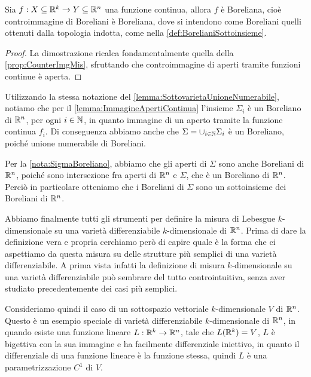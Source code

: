 \begin{lemma}\label{lemma:ContinuaImplicaBoreliana}
	Sia $f:X\subseteq\mathbb R^k\to Y\subseteq\mathbb R^n$ una funzione continua, allora $f$ è Boreliana, cioè controimmagine di Boreliani è Boreliana, dove si intendono come Boreliani quelli ottenuti dalla topologia indotta, come nella \cref{def:BorelianiSottoinsieme}. 
\end{lemma}
\begin{proof}
	La dimostrazione ricalca fondamentalmente quella della \cref{prop:CounterImgMis}, sfruttando che controimmagine di aperti tramite funzioni continue è aperta.
\end{proof}

\begin{remark}\label{nota:SigmaBoreliano}
	Utilizzando la stessa notazione del \cref{lemma:SottovarietaUnioneNumerabile}, notiamo che per il \cref{lemma:ImmagineApertiContinua} l'insieme $\Sigma_i$ è un Boreliano di $\mathbb R^n$, per ogni $i\in\mathbb N$, in quanto immagine di un aperto tramite la funzione continua $f_i$. Di conseguenza abbiamo anche che $\Sigma=\cup_{i\in\mathbb N}\Sigma_i$ è un Boreliano, poiché unione numerabile di Boreliani.  
\end{remark}

\begin{remark}\label{nota:BorelianiSottovarieta}
	Per la \cref{nota:SigmaBoreliano}, abbiamo che gli aperti di $\Sigma$ sono anche Boreliani di $\mathbb R^n$, poiché sono intersezione fra aperti di $\mathbb R^n$ e $\Sigma$, che è un Boreliano di $\mathbb R^n$. Perciò in particolare otteniamo che i Boreliani di $\Sigma$ sono un sottoinsieme dei Boreliani di $\mathbb R^n$.
\end{remark}

Abbiamo finalmente tutti gli strumenti per definire la misura di Lebesgue $k$-dimensionale su una varietà differenziabile $k$-dimensionale di $\mathbb R^n$. Prima di dare la definizione vera e propria cerchiamo però di capire quale è la forma che ci aspettiamo da questa misura su delle strutture più semplici di una varietà differenziabile. A prima vista infatti la definizione di misura $k$-dimensionale su una varietà differenziabile può sembrare del tutto controintuitiva, senza aver studiato precedentemente dei casi più semplici.

Consideriamo quindi il caso di un sottospazio vettoriale $k$-dimensionale $V$ di $\mathbb R^n$. Questo è un esempio speciale di varietà differenziabile $k$-dimensionale di $\mathbb R^n$, in quando esiste una funzione lineare $L:\mathbb R^k\to \mathbb R^n$, tale che $L(\mathbb R^k)=V$, $L$ è bigettiva con la sua immagine e ha facilmente differenziale iniettivo, in quanto il differenziale di una funzione lineare è la funzione stessa, quindi $L$ è una parametrizzazione $C^1$ di $V$.

